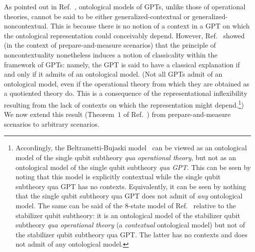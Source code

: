 \documentclass[onecolum,aps,groupedaddress,nofootinbib]{revtex4-2}
\begin{document}
As pointed out in Ref.~\cite{schmid2019characterization}, ontological models of GPTs, unlike those of operational theories, cannot be said to be either generalized-contextual or generalized-noncontextual. This is because there is no notion of a context in a GPT on which the ontological representation could conceivably depend.
However, Ref.~\cite{schmid2019characterization} showed (in the context of prepare-and-measure scenarios) that the principle of noncontextuality nonetheless induces a notion of classicality within the framework of GPTs: namely, the GPT is said to have a classical explanation if and only if it admits of an ontological model. (Not all GPTs admit of an ontological model, even if the operational theory from which they are obtained as a quotiented theory do. This is a consequence of the representational inflexibility resulting from the lack of contexts on which the representation might depend.\footnote{
Accordingly, the Beltrametti-Bujaski model~\cite{Beltrametti_1995} can be viewed as an ontological model of the single qubit subtheory {\em qua operational theory}, but not as an ontological model of the single qubit subtheory {\em qua GPT}.  This can be seen by noting that this model is explicitly contextual while the single qubit subtheory qua GPT has no contexts.  Equivalently, it can be seen by nothing that  the single qubit subtheory qua GPT does not admit of {\em any} ontological model.  The same can be said of the $8$-state model of Ref.~\cite{8state} relative to the stabilizer qubit subtheory: it is an ontological model of the stabilizer qubit subtheory {\em qua operational theory} (a {\em contextual} ontological model) but not of the stabilizer qubit subtheory qua GPT.  The latter has no contexts and does not admit of any ontological model.}) We now extend this result (Theorem~$1$ of Ref.~\cite{schmid2019characterization}) from prepare-and-measure scenarios to arbitrary scenarios.
\end{document}
